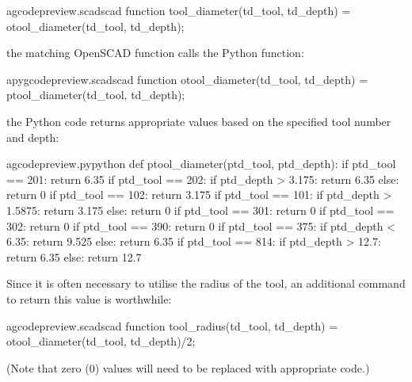 \documentclass{ltxdoc}
\begin{document}
\lstset{firstnumber=\thegcpscad}
\begin{writecode}{a}{gcodepreview.scad}{scad}
function tool_diameter(td_tool, td_depth) = otool_diameter(td_tool, td_depth);

\end{writecode}
\addtocounter{gcpscad}{2}

\noindent the matching OpenSCAD function calls the Python function:

\lstset{firstnumber=\thepyscad}
\begin{writecode}{a}{pygcodepreview.scad}{scad}
function otool_diameter(td_tool, td_depth) = ptool_diameter(td_tool, td_depth);

\end{writecode}
\addtocounter{pyscad}{2}
 
\noindent the Python code returns appropriate values 
based on the specified tool number and depth:
 
\lstset{firstnumber=\thegcpy}
\begin{writecode}{a}{gcodepreview.py}{python}
def ptool_diameter(ptd_tool, ptd_depth):
    if ptd_tool == 201:
        return 6.35
    if ptd_tool == 202:
        if ptd_depth > 3.175:
            return 6.35
        else:
            return 0
    if ptd_tool == 102:
        return 3.175
    if ptd_tool == 101:
        if ptd_depth > 1.5875:
            return 3.175
        else:
            return 0
    if ptd_tool == 301:
        return 0
    if ptd_tool == 302:
        return 0
    if ptd_tool == 390:
        return 0
    if ptd_tool == 375:
        if ptd_depth < 6.35:
            return 9.525
        else:
            return 6.35
    if ptd_tool == 814:
        if ptd_depth > 12.7:
            return 6.35
        else:
            return 12.7

\end{writecode}
\addtocounter{gcpy}{32}

Since it is often necessary to utilise the radius of the tool, an additional command to return
this value is worthwhile:
 
\lstset{firstnumber=\thegcpscad}
\begin{writecode}{a}{gcodepreview.scad}{scad}
function tool_radius(td_tool, td_depth) = otool_diameter(td_tool, td_depth)/2;

\end{writecode}
\addtocounter{gcpscad}{2}
 
(Note that zero (0) values will need to be replaced with appropriate code.)
 
\end{document}
